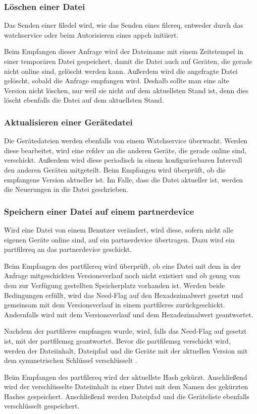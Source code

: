 \subsubsection{Löschen einer Datei}
Das Senden einer \gls{filedel} wird, wie das Senden eines \gls{filereq}, entweder durch das \gls{watchservice} oder beim Autorisieren eines \gls{appch} initiiert. 

Beim Empfangen dieser Anfrage wird der Dateiname mit einem Zeitstempel in einer temporären Datei gespeichert, damit die Datei auch auf Geräten, die gerade nicht online sind, gelöscht werden kann. Außerdem wird die angefragte Datei gelöscht, sobald die Anfrage empfangen wird. Deshalb sollte man eine alte Version nicht löschen, nur weil sie nicht auf dem aktuellsten Stand ist, denn dies löscht ebenfalls die Datei auf dem aktuellsten Stand.

\subsubsection{Aktualisieren einer Gerätedatei}
Die Gerätedateien werden ebenfalls von einem Watchservice überwacht. Werden diese bearbeitet, wird eine \gls{refdev} an die anderen Geräte, die gerade online sind, verschickt. Außerdem wird diese periodisch in einem konfigurierbaren Intervall den anderen Geräten mitgeteilt. Beim Empfangen wird überprüft, ob die empfangene Version aktueller ist. Im Falle, dass die Datei aktueller ist, werden die Neuerungen in die Datei geschrieben.

\subsubsection{Speichern einer Datei auf einem \gls{partnerdevice}}
Wird eine Datei von einem Benutzer verändert, wird diese, sofern nicht alle eigenen Geräte online sind, auf ein \gls{partnerdevice} übertragen. Dazu wird ein \gls{partfilereq} an das \gls{partnerdevice} geschickt. 

Beim Empfangen des \gls{partfilereq} wird überprüft, ob eine Datei mit dem in der Anfrage mitgeschickten Versionsverlauf noch nicht existiert und ob genug von dem zur Verfügung gestellten Speicherplatz vorhanden ist. Werden beide Bedingungen erfüllt, wird das Need-Flag auf den Hexadezimalwert  gesetzt und gemeinsam mit dem Versionsverlauf in einem \gls{partfileres} zurückgeschickt. Andernfalls wird mit dem Versionsverlauf und dem Hexadezimalwert  geantwortet. 

Nachdem der \gls{partfileres} empfangen wurde, wird, falls das Need-Flag auf  gesetzt ist, mit der \gls{partfilemsg} geantwortet. Bevor die \gls{partfilemsg} verschickt wird, werden der Dateiinhalt, Dateipfad und die Geräte mit der aktuellen Version mit dem symmetrischen Schlüssel verschlüsselt .

Beim Empfangen des \gls{partfilereq} wird der aktuellste Hash gekürzt. Anschließend wird der verschlüsselte Dateiinhalt in einer Datei mit dem Namen des gekürzten Hashes gespeichert. Anschließend werden Dateipfad und die Geräteliste ebenfalls verschlüsselt gespeichert.
